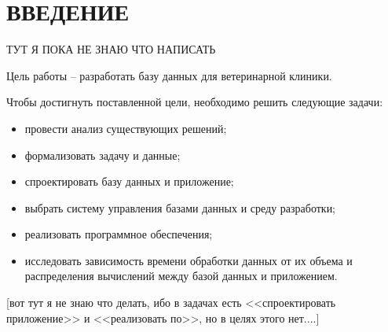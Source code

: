 \section*{ВВЕДЕНИЕ}

ТУТ Я ПОКА НЕ ЗНАЮ ЧТО НАПИСАТЬ

Цель работы -- разработать базу данных для ветеринарной клиники.

Чтобы достигнуть поставленной цели, необходимо решить следующие задачи:
\begin{itemize}[label*=---]
	\item провести анализ существующих решений;
    \item формализовать задачу и данные;
    \item спроектировать базу данных и приложение;
    \item выбрать систему управления базами данных и среду разработки;
    \item реализовать программное обеспечения;
    \item исследовать зависимость времени обработки данных от их объема и распределения вычислений между базой данных и приложением.
\end{itemize}


[вот тут я не знаю что делать, ибо  в задачах есть <<спроектировать приложение>> и <<реализовать по>>, но в целях этого нет....]